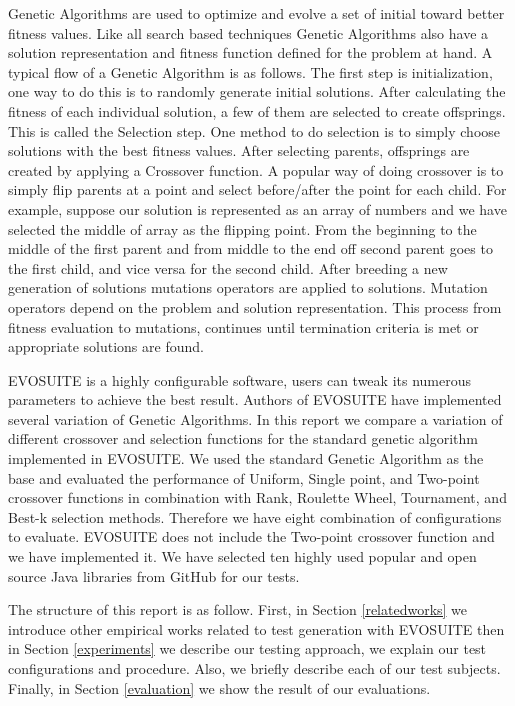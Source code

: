 \documentclass[sigconf]{acmart}
\begin{document}
Genetic Algorithms are used to optimize and evolve a set of initial toward better fitness values.
Like all search based techniques Genetic Algorithms also have a solution representation and fitness function 
defined for the problem at hand. A typical flow of a Genetic Algorithm is as follows. 
The first step is initialization, one way to do this is to randomly generate initial solutions. After calculating
the fitness of each individual solution, a few of them are selected to create offsprings. This is called 
the Selection step. One method to do selection is to simply choose solutions with the best fitness values.
After selecting parents, offsprings are created by applying a Crossover function. A popular way of doing crossover
is to simply flip parents at a point and select before/after the point for each child. For example, suppose
our solution is represented as an array of numbers and we have selected the middle of array as the flipping point.
From the beginning to the middle of the first parent and from middle to the end off
second parent goes to the first child, and vice versa for the second child. After breeding a new generation of
solutions mutations operators are applied to solutions. Mutation operators depend on the problem and 
solution representation. This process from fitness evaluation to mutations, continues until termination criteria
is met or appropriate solutions are found.

EVOSUITE is a highly configurable software, users can tweak its numerous parameters to achieve the best result. 
Authors of EVOSUITE have implemented several variation of Genetic Algorithms. In this report we compare 
a variation of different crossover and selection functions for the standard genetic algorithm implemented in EVOSUITE.
We used the standard Genetic Algorithm as the base and evaluated the performance of 
Uniform, Single point, and Two-point crossover functions in combination with Rank, Roulette Wheel, Tournament, 
and Best-k selection methods. Therefore we have eight combination of configurations to evaluate. 
EVOSUITE does not include the Two-point crossover function and we have implemented it.
We have selected ten highly used popular and open source Java libraries from GitHub for our tests.

The structure of this report is as follow. First, in Section \ref{relatedworks} we introduce other
empirical works related to test generation with EVOSUITE then in Section \ref{experiments} we describe
our testing approach, we explain our test configurations and procedure. Also, we briefly describe each of
our test subjects. Finally, in Section \ref{evaluation} we show the result of our evaluations.
\end{document}
